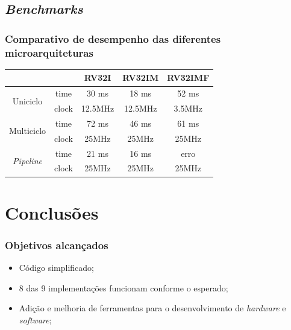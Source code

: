 \documentclass[aspectratio=169]{beamer}
\begin{document}
    \subsection{\textit{Benchmarks}}
    \begin{frame}
        \frametitle{Comparativo de desempenho das diferentes microarquiteturas}
        \vfill
        \begin{longtable}{cc|c|c|c|}
            \cline{3-5}
                                                                    &                               & RV32I       & RV32IM      & RV32IMF   \\
            \hline
            \endhead
            \multicolumn{1}{|c}{\multirow{2}{*}{{Uniciclo}}}        & \multicolumn{1}{|c|}{time}    & 30 ms       & 18 ms       & 52 ms \\
            \cline{2-5}
            \multicolumn{1}{|c}{ }                                  & \multicolumn{1}{|c|}{clock}   & 12.5MHz     & 12.5MHz     & 3.5MHz \\
            \hline
            \multicolumn{1}{|c}{\multirow{2}{*}{{Multiciclo}}}      & \multicolumn{1}{|c|}{time}    & 72 ms       & 46 ms       & 61 ms \\
            \cline{2-5}
            \multicolumn{1}{|c}{ }                                  & \multicolumn{1}{|c|}{clock}   & 25MHz       & 25MHz       & 25MHz \\
            \hline
            \multicolumn{1}{|c}{\multirow{2}{*}{\textit{Pipeline}}} & \multicolumn{1}{|c|}{time}    & 21 ms       & 16 ms       & erro \\
            \cline{2-5}
            \multicolumn{1}{|c}{ }                                  & \multicolumn{1}{|c|}{clock}   & 25MHz       & 25MHz       & 25MHz \\
            \hline
        \end{longtable}
        \vfill
    \end{frame}

\section{Conclusões}
    \begin{frame}
        \frametitle{Objetivos alcançados}
        \vfill
        \begin{itemize}
            \item Código simplificado;
            \item 8 das 9 implementações funcionam conforme o esperado;
            \item Adição e melhoria de ferramentas para o desenvolvimento de \textit{hardware} e \textit{software};
        \end{itemize}
        \vfill
    \end{frame}
\end{document}

